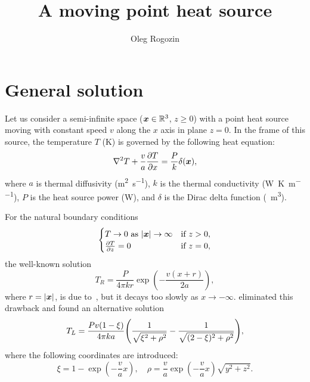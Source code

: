 \documentclass{article}
\title{A moving point heat source}
\author{Oleg Rogozin}
\newcommand{\bx}{\vb*{x}}
\begin{document}
\maketitle

\section{General solution}

Let us consider a semi-infinite space ($\bx\in\mathbb{R}^3$, $z\geq0$) with a point heat source
moving with constant speed $v$ along the $x$ axis in plane $z=0$.
In the frame of this source, the temperature $T$ (\si{K}) is governed by the following heat equation:
\begin{equation}\label{eq:heat}
    \laplacian{T} + \frac{v}{a}\pdv{T}{x} = \frac{P}{k}\delta(\bx),
\end{equation}
where $a$ is thermal diffusivity (\si{\m\squared\per\s}),
$k$ is the thermal conductivity (\si{\W\per\K\per\m}),
$P$ is the heat source power (\si{\W}),
and $\delta$ is the Dirac delta function (\si{\per\m\cubed}).

For the natural boundary conditions
\begin{equation}\label{eq:bc}
    \begin{cases}
        T\to0 \text{ as } |\bx|\to\infty & \text{if } z>0, \\
        \pdv{T}{z}=0 & \text{if } z=0,
    \end{cases}
\end{equation}
the well-known solution
\begin{equation}\label{eq:TR}
    T_R = \frac{P}{4\pi kr}\exp(-\frac{v(x+r)}{2a}),
\end{equation}
where $r = |\bx|$, is due to~\textcite{rosenthal1946theory}, but it decays too slowly as $x\to-\infty$.
\textcite{levin2008general} eliminated this drawback and found an alternative solution
\begin{equation}\label{eq:TL}
    T_L = \frac{Pv(1-\xi)}{4\pi ka}\qty( \frac1{\sqrt{\xi^2 +\rho^2}} - \frac1{\sqrt{(2-\xi)^2 +\rho^2}} ),
\end{equation}
where the following coordinates are introduced:
\begin{equation}
    \xi = 1 - \exp(-\frac{v}{a}x), \quad
    \rho = \frac{v}{a}\exp(-\frac{v}{a}x)\sqrt{y^2 + z^2}.
\end{equation}
\end{document}
